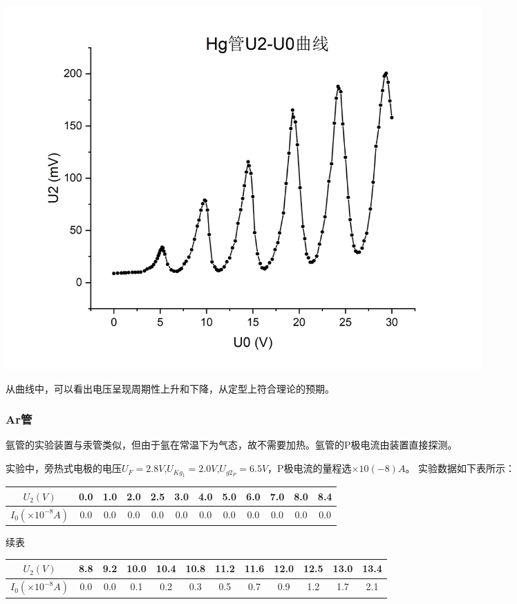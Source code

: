 \documentclass{article}
\begin{document}
    \begin{center}
        \includegraphics[width=0.8\textwidth]{Hg curve1.jpg}
    \end{center}

    从曲线中，可以看出电压呈现周期性上升和下降，从定型上符合理论的预期。

    \subsubsection{Ar管}
    氩管的实验装置与汞管类似，但由于氩在常温下为气态，故不需要加热。氩管的P极电流由装置直接探测。
    
    实验中，旁热式电极的电压$U_{F}=2.8V$,$U_{Kg_1}=2.0V$,$U_{g2_P}=6.5V$，P极电流的量程选$\times 10(-8)A$。
    实验数据如下表所示：

    \begin{center}
        \begin{tabular}{|c|c|c|c|c|c|c|c|c|c|c|c|}
            \hline
            $U_2(V)$ & 0.0   & 1.0   & 2.0   & 2.5   & 3.0   & 4.0   & 5.0   & 6.0   & 7.0   & 8.0   & 8.4  \bigstrut\\
            \hline
            $I_0(\times 10^{-8}A)$ & 0.0   & 0.0   & 0.0   & 0.0   & 0.0   & 0.0   & 0.0   & 0.0   & 0.0   & 0.0   & 0.0  \bigstrut\\
            \hline
        \end{tabular}%
    \end{center}

    续表

    \begin{center}
        \begin{tabular}{|c|c|c|c|c|c|c|c|c|c|c|c|}
            \hline
            $U_2(V)$ & 8.8   & 9.2   & 10.0  & 10.4  & 10.8  & 11.2  & 11.6  & 12.0  & 12.5  & 13.0  & 13.4  \bigstrut\\
            \hline
            $I_0(\times 10^{-8}A)$ & 0.0   & 0.0   & 0.1   & 0.2   & 0.3   & 0.5   & 0.7   & 0.9   & 1.2   & 1.7   & 2.1  \bigstrut\\
            \hline
        \end{tabular}%
    \end{center}
\end{document}
